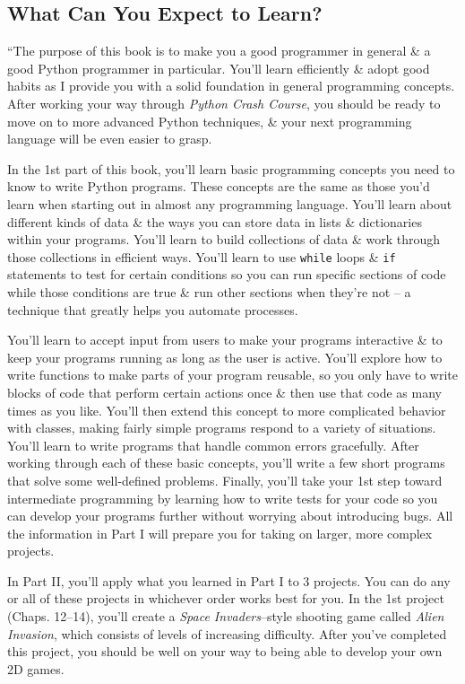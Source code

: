 \documentclass[oneside]{book}
\numberwithin{equation}{section}
\begin{document}
\subsection*{What Can You Expect to Learn?}
``The purpose of this book is to make you a good programmer in general \& a good Python programmer in particular. You'll learn efficiently \& adopt good habits as I provide you with a solid foundation in general programming concepts. After working your way through \textit{Python Crash Course}, you should be ready to move on to more advanced Python techniques, \& your next programming language will be even easier to grasp.

In the 1st part of this book, you'll learn basic programming concepts you need to know to write Python programs. These concepts are the same as those you'd learn when starting out in almost any programming language. You'll learn about different kinds of data \& the ways you can store data in lists \& dictionaries within your programs. You'll learn to build collections of data \& work through those collections in efficient ways. You'll learn to use \texttt{while} loops \& \texttt{if} statements to test for certain conditions so you can run specific sections of code while those conditions are true \& run other sections when they're not -- a technique that greatly helps you automate processes.

You'll learn to accept input from users to make your programs interactive \& to keep your programs running as long as the user is active. You'll explore how to write functions to make parts of your program reusable, so you only have to write blocks of code that perform certain actions once \& then use that code as many times as you like. You'll then extend this concept to more complicated behavior with classes, making fairly simple programs respond to a variety of situations. You'll learn to write programs that handle common errors gracefully. After working through each of these basic concepts, you'll write a few short programs that solve some well-defined problems. Finally, you'll take your 1st step toward intermediate programming by learning how to write tests for your code so you can develop your programs further without worrying about introducing bugs. All the information in Part I will prepare you for taking on larger, more complex projects.

In Part II, you'll apply what you learned in Part I to 3 projects. You can do any or all of these projects in whichever order works best for you. In the 1st project (Chaps. 12--14), you'll create a \textit{Space Invaders}--style shooting game called \textit{Alien Invasion}, which consists of levels of increasing difficulty. After you've completed this project, you should be well on your way to being able to develop your own 2D games.
\end{document}
